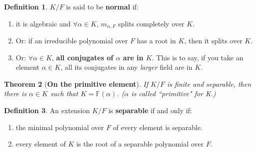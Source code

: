\documentclass[9pt,reqno,twoside]{amsbook}
\theoremstyle{plain}
\newtheorem{theorem}{Theorem}[chapter]
\numberwithin{section}{chapter}
\numberwithin{equation}{chapter}
\theoremstyle{definition}
\newtheorem{Def}[theorem]{Definition}
\theoremstyle{remark}
\theoremstyle{plain}
\newcommand{\F}{\mathbb{F}}
\begin{document}
\begin{Def} 
$K/F$ is said to be \textbf{normal} if:
\begin{enumerate}
\item it is algebraic and $\forall \alpha \in K$, $m_{\alpha,F}$ splits completely over $K$.
\item Or: if an irreducible polynomial over $F$ has a root in $K$, then it splits over $K$. 
\item Or: $\forall \alpha \in K$, \textbf{all conjugates of $\alpha$ are in $K$}. This is to say, if you take an element $\alpha \in K$, all its conjugates in any \textit{larger} field are in $K$. 
\end{enumerate}  
\end{Def} 

\begin{theorem}[\textbf{On the primitive element}]
 If $K/F$ is finite and separable, then there is $\alpha \in K$ such that $K = \F(\alpha)$. ($\alpha$ is called ``primitive" for K.)
 \end{theorem}
 
 \begin{Def}
An extension $K/F$ is \textbf{separable} if and only if:
\begin{enumerate}
\item the minimal polynomial over $F$ of every element is separable. 
\item every element of $K$ is the root of a separable polynomial over $F$.
\end{enumerate} 
\end{Def}
\end{document}
